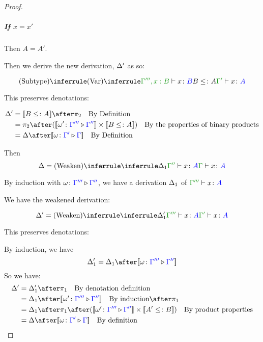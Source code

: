 \documentclass{report}
\begin{document}
\begin{framed}
\begin{proof}
            \subparagraph{If $x = x'$}
        
            Then $A = A'$.
        
            Then we derive the new derivation, $\Delta'$ as so:
        
            \begin{equation}
                \ntreeruleII{Subtype}{
                    \ntreeruleI{Var}{ }{\typerelation{\G''', x: B}{x}{B}}
                    }{
                    B \subtype A
                }{
                    \typerelation{\G'}{x}{A}
                }
            \end{equation}
        
            This preserves denotations:
        
            \begin{align*}
                \D' & = \deno{B\subtype A}\after\pp\qt{By Definition} \\
                 & = \pp\after (\deno{\wrel{\w'}{\G'''}{\G''}}\times \deno{B\subtype A}) \qt{By the properties of binary products}\\
                 & = \D\after\deno{\wrel{\w}{\G'}{\G}}\qt{By Definition}
            \end{align*}
        
            Then 
            \begin{equation}
                \D = \ntreeruleI{Weaken}{\treeruleI{\D_1}{\typerelation{\G''}{x}{A}}}{\gtyperelation{x}{A}}
            \end{equation}
        
            By induction with $\omega \colon {\color{blue}\Gamma'''} \triangleright {\color {blue} \Gamma''}$,
             we have a derivation $\Delta_1$ of $\typerelation{\G'''}{x}{A}$
        
            We have the weakened derivation:
        
            \begin{equation}
                \D' = \ntreeruleI{Weaken}{\treeruleI{\D_1'}{\typerelation{\G'''}{x}{A}}}{\typerelation{\G'}{x}{A}}
            \end{equation}
        
            This preserves denotations:
        
            By induction, we have
            \begin{equation}
                \D_1' = \D_1 \after \deno{\wrel{\w}{\G'''}{\G''}}
            \end{equation}
            So we have:
            \begin{align*}
                \D' &= \D_1' \after \p\qt{By denotation definition}\\
                & = \D_1\after\deno{\wrel{\w'}{\G'''}{\G''}}\qt{By induction}\after\p \\
                & = \D_1\after\p\after(\deno{\wrel{\w'}{\G'''}{\G''}}\times\deno{A' \subtype B})\qt{By product properties}\\
                & = \D\after\deno{\wrel{\w}{\G'}{\G}}\qt{By definition}
            \end{align*}
        

\end{proof}
\end{framed}
\end{document}
